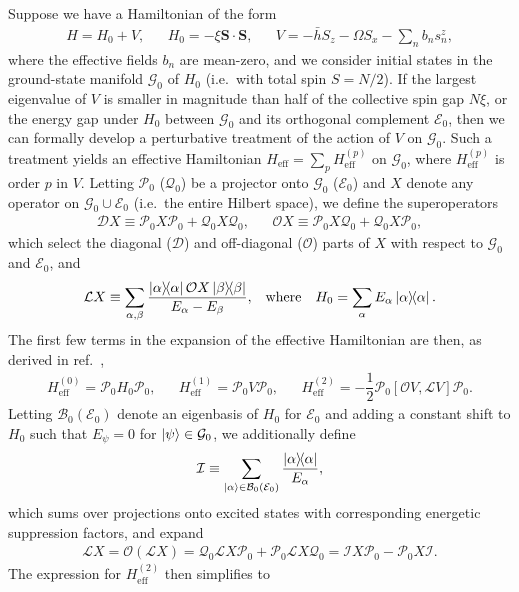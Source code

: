 \documentclass[aps,notitlepage,nofootinbib,11pt]{revtex4-1}
\renewcommand{\t}{\text} %
\newcommand{\f}[2]{\dfrac{#1}{#2}} %
\newcommand{\p}[1]{\left(#1\right)} %
\renewcommand{\sp}[1]{\left[#1\right]} %
\renewcommand{\v}{\bm} %
\renewcommand{\c}{\cdot} %
\newcommand{\B}{\mathcal{B}}
\newcommand{\D}{\mathcal{D}}
\newcommand{\E}{\mathcal{E}}
\newcommand{\G}{\mathcal{G}}
\newcommand{\I}{\mathcal{I}}
\renewcommand{\L}{\mathcal{L}}
\renewcommand{\O}{\mathcal{O}}
\renewcommand{\P}{\mathcal{P}}
\newcommand{\Q}{\mathcal{Q}}
\newcommand{\1}{\hat{\mathds{1}}}
\begin{document}
Suppose we have a Hamiltonian of the form
\begin{align}
  H = H_0 + V,
  &&
  H_0 = - \xi\v S\c\v S,
  &&
  V = - \bar h S_z - \Omega S_x - \sum_n b_n s_n^z,
\end{align}
where the effective fields $b_n$ are mean-zero, and we consider
initial states in the ground-state manifold $\G_0$ of $H_0$ (i.e.~with
total spin $S=N/2$).  If the largest eigenvalue of $V$ is smaller in
magnitude than half of the collective spin gap $N\xi$, or the energy
gap under $H_0$ between $\G_0$ and its orthogonal complement $\E_0$,
then we can formally develop a perturbative treatment of the action of
$V$ on $\G_0$.  Such a treatment yields an effective Hamiltonian
$H_{\t{eff}}=\sum_pH_{\t{eff}}^{(p)}$ on $\G_0$, where
$H_{\t{eff}}^{(p)}$ is order $p$ in $V$.  Letting $\P_0$ ($\Q_0$) be a
projector onto $\G_0$ ($\E_0$) and $X$ denote any operator on
$\G_0\cup\E_0$ (i.e.~the entire Hilbert space), we define the
superoperators
\begin{align}
  \D X \equiv \P_0 X \P_0 + \Q_0 X \Q_0,
  &&
  \O X \equiv \P_0 X \Q_0 + \Q_0 X \P_0,
\end{align}
which select the diagonal ($\D$) and off-diagonal ($\O$) parts of $X$
with respect to $\G_0$ and $\E_0$, and
\begin{align}
  \L X \equiv \sum_{\alpha,\beta}
  \f{\op{\alpha}\O X\op{\beta}}{E_\alpha-E_\beta},
  &&
  \t{where}
  &&
  H_0 = \sum_\alpha E_\alpha \op\alpha.
\end{align}
The first few terms in the expansion of the effective Hamiltonian are
then, as derived in ref.~\cite{bravyi2011schrieffer},
\begin{align}
  H_{\t{eff}}^{(0)} = \P_0 H_0 \P_0,
  &&
  H_{\t{eff}}^{(1)} = \P_0 V \P_0,
  &&
  H_{\t{eff}}^{(2)} = -\f12 \P_0 \sp{\O V,\L V} \P_0.
\end{align}
Letting $\B_0\p{\E_0}$ denote an eigenbasis of $H_0$ for $\E_0$ and
adding a constant shift to $H_0$ such that $E_\psi=0$ for
$\ket\psi\in\G_0$, we additionally define
\begin{align}
  \I \equiv \sum_{\ket\alpha\in\B_0\p{\E_0}} \f{\op\alpha}{E_\alpha},
\end{align}
which sums over projections onto excited states with corresponding
energetic suppression factors, and expand
\begin{align}
  \L X = \O\p{\L X}
  = \Q_0 \L X \P_0 + \P_0 \L X \Q_0
  = \I X \P_0 - \P_0 X \I.
\end{align}
The expression for $H_{\t{eff}}^{(2)}$ then simplifies to
\end{document}
